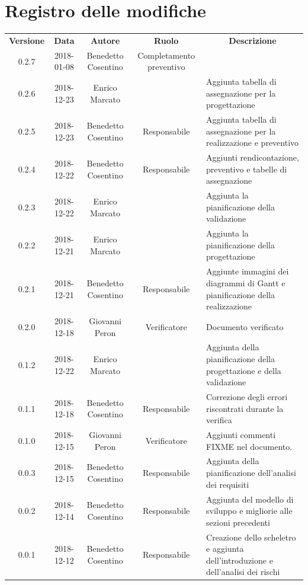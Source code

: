 \documentclass[11pt,a4paper]{article}
\begin{document}
	
	
	\newpage
	\section*{\centering Registro delle modifiche}
	\begin{tabularx}{\textwidth}{ c | c | c | c | X }
		\rowcolor{LightBlue}
		\color{white}\bfseries Versione & 
		\color{white}\bfseries Data & 
		\color{white}\bfseries Autore & 
		\color{white}\bfseries Ruolo & 
		\multicolumn{1}{c}{\color{white}\bfseries Descrizione}\\[0.25cm]

		0.2.7 & 2018-01-08 & Benedetto Cosentino & Completamento preventivo \\		
		0.2.6 & 2018-12-23 & Enrico Marcato &  & Aggiunta tabella di assegnazione per la progettazione\\
		0.2.5 & 2018-12-23 & Benedetto Cosentino & Responsabile & Aggiunta tabella di assegnazione per la realizzazione e preventivo\\
		0.2.4 & 2018-12-22 & Benedetto Cosentino & Responsabile & Aggiunti rendicontazione, preventivo e tabelle di assegnazione \\
		0.2.3 & 2018-12-22 & Enrico Marcato &  & Aggiunta la pianificazione della validazione\\
		0.2.2 & 2018-12-21 & Enrico Marcato &  & Aggiunta la pianificazione della progettazione\\
		0.2.1 & 2018-12-21 & Benedetto Cosentino & Responsabile & Aggiunte immagini dei diagrammi di Gantt e pianificazione della realizzazione\\
		0.2.0 & 2018-12-18 & Giovanni Peron & Verificatore & Documento verificato\\
		0.1.2 & 2018-12-22 & Enrico Marcato &  & Aggiunta della pianificazione della progettazione e della validazione\\
		0.1.1 & 2018-12-18 & Benedetto Cosentino & Responsabile & Correzione degli errori riscontrati durante la verifica\\
		0.1.0 & 2018-12-15 & Giovanni Peron & Verificatore & Aggiunti commenti FIXME nel documento.\\
		0.0.3 & 2018-12-15 & Benedetto Cosentino & Responsabile & Aggiunta della pianificazione dell'analisi dei requisiti\\
		0.0.2 & 2018-12-14 & Benedetto Cosentino & Responsabile & Aggiunta del modello di sviluppo e migliorie alle sezioni precedenti\\
		0.0.1 & 2018-12-12 & Benedetto Cosentino & Responsabile & Creazione dello scheletro e aggiunta dell'introduzione e dell'analisi dei rischi\\
	\end{tabularx}
	\newpage
	\tableofcontents
	\newpage	
\end{document}
